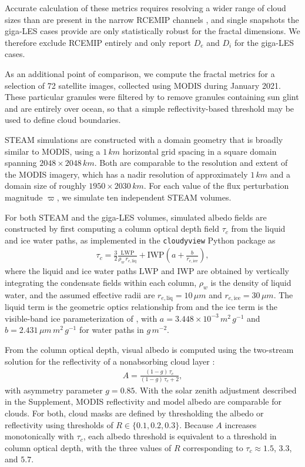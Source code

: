 \documentclass[acp, manuscript, english]{copernicus}
\begin{document}
Accurate calculation of these metrics requires resolving a wider range of cloud sizes than are present in the narrow RCEMIP channels \citep{dewitt2024b}, and single snapshots the giga-LES cases provide are only statistically robust for the fractal dimensions. We therefore exclude RCEMIP entirely and only report $D_e$ and $D_i$ for the giga-LES cases.

As an additional point of comparison, we compute the fractal metrics for a selection of 72 satellite images, collected using MODIS during January 2021. These particular granules were filtered by \citet{dewitt2026} to remove granules containing sun glint and are entirely over ocean, so that a simple reflectivity-based threshold may be used to define cloud boundaries. 

STEAM simulations are constructed with a domain geometry that is broadly similar to MODIS, using a $1\,\unit{km}$ horizontal grid spacing in a square domain spanning $2048\times 2048\,\unit{km}$. Both are comparable to the resolution and extent of the MODIS imagery, which has a nadir resolution of approximately $1\,\unit{km}$ and a domain size of roughly $1950\times2030\,\unit{km}$. For each value of the flux perturbation magnitude $\varpi$, we simulate ten independent STEAM volumes.

For both STEAM and the giga-LES volumes, simulated albedo fields are constructed by first computing a column optical depth field $\tau_c$ from the liquid and ice water paths, as implemented in the \verb|cloudyview| Python package as
\begin{align}
  \tau_c = \frac{3}{2}\frac{\mathrm{LWP}}{\rho_w\, r_{e,\mathrm{liq}}} + \mathrm{IWP}\left(a + \frac{b}{r_{e,\mathrm{ice}}}\right), \label{eq:bulk optics}
\end{align}
where the liquid and ice water paths $\mathrm{LWP}$ and $\mathrm{IWP}$ are obtained by vertically integrating the condensate fields within each column, $\rho_w$ is the density of liquid water, and the assumed effective radii are $r_{e,\mathrm{liq}} = 10\,\unit{\mu m}$ and $r_{e,\mathrm{ice}} = 30\,\unit{\mu m}$. The liquid term is the geometric optics relationship from \citet[Eq. 7.86 of][]{petty2006} and the ice term is the visible-band ice parameterization of \citet{ebert1992}, with $a = 3.448\times10^{-3}\,\unit{m^2\,g^{-1}}$ and $b = 2.431\,\unit{\mu m\, m^2\,g^{-1}}$ for water paths in $\unit{g\,m^{-2}}$. 

From the column optical depth, visual albedo is computed using the two-stream solution for the reflectivity of a nonabsorbing cloud layer \citep[Eq. 5.51 of][]{bohren2008}:
\begin{align}
  A = \frac{(1-g)\,\tau_c}{(1-g)\,\tau_c + 2}, \label{eq:two stream albedo}
\end{align}
with asymmetry parameter $g = 0.85$. With the solar zenith adjustment described in the Supplement, MODIS reflectivity and model albedo are comparable for clouds. For both, cloud masks are defined by thresholding the albedo or reflectivity using thresholds of $R \in \{0.1, 0.2, 0.3\}$. Because $A$ increases monotonically with $\tau_c$, each albedo threshold is equivalent to a threshold in column optical depth, with the three values of $R$ corresponding to $\tau_c \approx 1.5$, $3.3$, and $5.7$.
\end{document}
